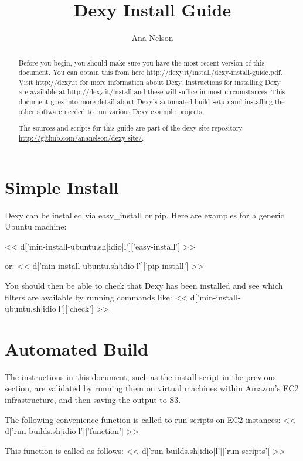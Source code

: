 \documentclass{tufte-handout}
\title{Dexy Install Guide}
\author{Ana Nelson}
\begin{document}
\maketitle

\begin{abstract}
Before you begin, you should make sure you have the most recent version of this document. You can obtain this from here \url{http://dexy.it/install/dexy-install-guide.pdf}. Visit \url{http://dexy.it} for more information about Dexy. Instructions for installing Dexy are available at \url{http://dexy.it/install} and these will suffice in most circumstances. This document goes into more detail about Dexy's automated build setup and installing the other software needed to run various Dexy example projects.

The sources and scripts for this guide are part of the dexy-site repository \url{http://github.com/ananelson/dexy-site/}.

\end{abstract}

\section{Simple Install}

Dexy can be installed via easy\_install or pip. Here are examples for a generic Ubuntu machine:

<< d['min-install-ubuntu.sh|idio|l']['easy-install'] >>

\noindent or:
<< d['min-install-ubuntu.sh|idio|l']['pip-install'] >>

\noindent You should then be able to check that Dexy has been installed and see which filters are available by running commands like:
<< d['min-install-ubuntu.sh|idio|l']['check'] >>

\section{Automated Build}

The instructions in this document, such as the install script in the previous section, are validated by running them on virtual machines within Amazon's EC2 infrastructure, and then saving the output to S3.

\noindent The following convenience function is called to run scripts on EC2 instances:
<< d['run-builds.sh|idio|l']['function'] >>

\noindent This function is called as follows:
<< d['run-builds.sh|idio|l']['run-scripts'] >>
\end{document}
